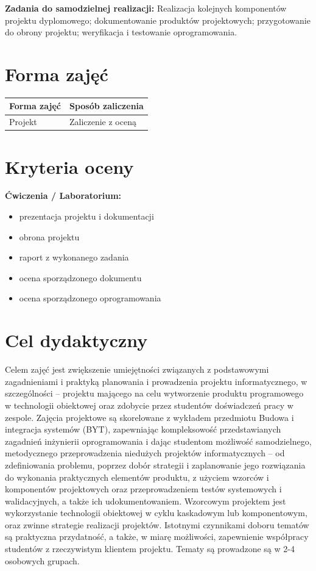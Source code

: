 \documentclass[12pt, a4paper]{article}
\newcommand{\thdrule}{\noalign{\global\setlength{\extrarowheight}{0pt}}}
\newcommand{\thdend}{\noalign{\global\setlength{\extrarowheight}{3pt}}}
\begin{document}
\vspace{4pt}
\noindent\textbf{Zadania do samodzielnej realizacji:} Realizacja kolejnych komponentów projektu dyplomowego; dokumentowanie produktów projektowych; przygotowanie do obrony projektu; weryfikacja i testowanie oprogramowania.

\section{Forma zajęć}

\begin{center}
{\scriptsize
\begin{tabular}{m{5cm}m{8cm}}
\thdrule\toprule
\rowcolor{pjatkRed} {\color{white}\textbf{Forma zajęć}} & {\color{white}\textbf{Sposób zaliczenia}} \\
\midrule\thdend
  \rowcolor{tableRowLight} Projekt & Zaliczenie z oceną \\
\bottomrule
\end{tabular}}
\end{center}

\section{Kryteria oceny}

\textbf{Ćwiczenia / Laboratorium:}
\begin{itemize}
  \item prezentacja projektu i dokumentacji
  \item obrona projektu
  \item raport z wykonanego zadania
  \item ocena sporządzonego dokumentu
  \item ocena sporządzonego oprogramowania
\end{itemize}


\section{Cel dydaktyczny}

Celem zajęć jest zwiększenie umiejętności związanych z podstawowymi zagadnieniami i praktyką planowania i prowadzenia projektu informatycznego, w szczególności – projektu mającego na celu wytworzenie produktu programowego w technologii obiektowej oraz zdobycie przez studentów doświadczeń pracy w zespole. Zajęcia projektowe są skorelowane z wykładem przedmiotu Budowa i integracja systemów (BYT), zapewniając kompleksowość przedstawianych zagadnień inżynierii oprogramowania i dając studentom możliwość samodzielnego, metodycznego przeprowadzenia niedużych projektów informatycznych – od zdefiniowania problemu, poprzez dobór strategii i zaplanowanie jego rozwiązania do wykonania praktycznych elementów produktu, z użyciem wzorców i komponentów projektowych oraz przeprowadzeniem testów systemowych i walidacyjnych, a także ich udokumentowaniem. Wzorcowym projektem jest wykorzystanie technologii obiektowej w cyklu kaskadowym lub komponentowym, oraz zwinne strategie realizacji projektów. Istotnymi czynnikami doboru tematów są praktyczna przydatność, a także, w miarę możliwości, zapewnienie współpracy studentów z rzeczywistym klientem projektu. Tematy są prowadzone są w 2-4 osobowych grupach.
\end{document}
